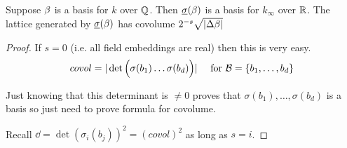 \documentclass[11pt]{article}
\begin{document}
\begin{lemma}
Suppose $\beta$ is a basis for $k$ over $\mathbb{Q}$.
	Then $\underline\sigma (\beta)$ is a basis for $k_\infty$ over $\mathbb{R}$.
	The lattice generated by $\underline\sigma(\beta)$ has covolume $2^{-s} \sqrt{|\Delta \beta|}$
\end{lemma}
\begin{proof}
	If $s=0$ (i.e. all field embeddings are real) then this is very easy.
	\begin{align*}
		covol = |\det \Big( \sigma(b_1) \dots \sigma(b_d)\Big)| && \text{ for } \mathcal{B} = \{ b_1, \dots, b_d\}
	\end{align*}

	Just knowing that this determinant is $\neq 0$ proves that $\sigma(b_1) , \dots , \sigma(b_d) $ is a basis so just need to prove formula for covolume.

	Recall $\dd = \det(\sigma_i(b_j))^2 = (covol)^2$ as long as $s=i$.




\end{proof}
\end{document}
